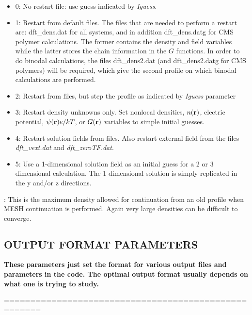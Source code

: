 \documentclass[10pt,onecolumn]{article}
\begin{document}
\begin{itemize}
\item 0:  No restart file: use guess indicated by {\it Iguess}.

\item1:  Restart from default files.  The files
that are needed to perform a restart are: dft\_dens.dat for
all systems, and in addition dft\_dens.datg for CMS polymer calculations.  The former contains the density and field variables while the latter stores the chain information in the $G$ functions. In order to do binodal calculations, the files
dft\_dens2.dat (and dft\_dens2.datg for CMS polymers) will be required, which give the second profile on which binodal calculations are performed.

\item 2:  Restart from files, but step the profile as indicated by {\it Iguess} parameter

\item 3:  Restart density
unknowns only.  Set nonlocal densities, $n({\bf r})$,
electric potential, $\psi({\bf r})e/kT$, or $G({\bf r})$ variables to
simple initial guesses. 

\item 4:  Restart solution fields from files.  Also restart external field from the files
{\it dft\_vext.dat} and {\it dft\_zeroTF.dat}.

\item 5: Use a 1-dimensional solution field as an initial guess for a 2 or 3 dimensional calculation.  The 1-dimensional solution is simply replicated in the y and/or z directions. 
\end{itemize}

\vspace{0.1in}
:  This is the maximum density allowed for
continuation from an old profile when MESH continuation is
performed.  Again very large densities can be difficult to
converge.

\vfill
\break


\subsection{OUTPUT FORMAT PARAMETERS}
{\bf  These parameters just set
the format for various output files and parameters in the code.
The optimal output format usually depends on what one is
trying to study.}

\noindent=====================================================
\end{document}
